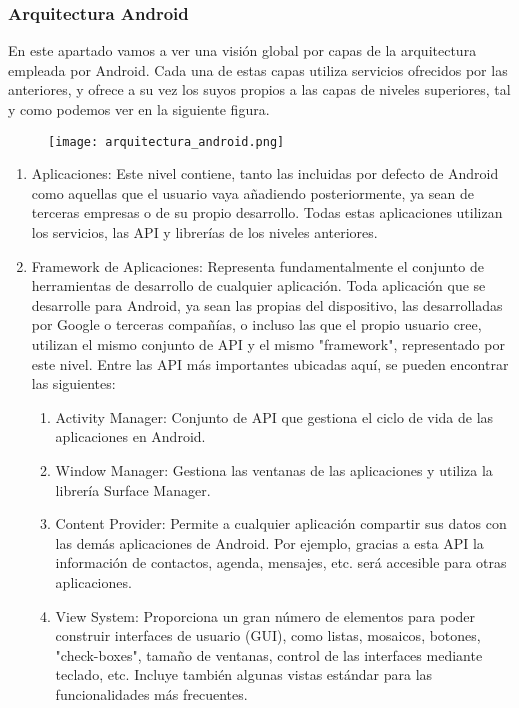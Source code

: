 	\subsubsection{Arquitectura Android}
En este apartado vamos a ver una visión global por capas de la
 arquitectura empleada por Android. Cada una de estas capas utiliza
 servicios ofrecidos por las anteriores, y ofrece a su vez los suyos 
propios a las capas de niveles superiores, tal y como podemos ver
 en la siguiente figura.
\begin{figure}[h]
\texttt{[image: arquitectura\_android.png]} 
\end{figure}


\begin{enumerate}
\item	Aplicaciones: Este nivel contiene, tanto las incluidas por defecto 
de Android como aquellas que el usuario vaya añadiendo posteriormente,
 ya sean de terceras empresas o de su propio desarrollo. 
Todas estas aplicaciones utilizan los servicios, las API y
 librerías de los niveles anteriores. 
\item	Framework de Aplicaciones: Representa fundamentalmente el
 conjunto de herramientas de desarrollo de cualquier aplicación. 
Toda aplicación que se desarrolle para Android, ya sean las propias 
del dispositivo, las desarrolladas por Google o terceras compañías,
 o incluso las que el propio usuario cree, utilizan el mismo conjunto
 de API y el mismo "framework", representado por este nivel. 
Entre las API más importantes ubicadas aquí, se pueden encontrar las siguientes:
\begin{enumerate}
\item	Activity Manager: Conjunto de API que gestiona el ciclo de vida de
 las aplicaciones en Android.
\item	Window Manager: Gestiona las ventanas de las aplicaciones y
 utiliza la librería Surface Manager.
\item	Content Provider: Permite a cualquier aplicación compartir sus
 datos con las demás aplicaciones de Android. Por ejemplo, gracias a 
esta API la información de contactos, agenda, mensajes, etc. 
será accesible para otras aplicaciones.
\item	View System: Proporciona un gran número de elementos para poder
 construir interfaces de usuario (GUI), como listas, mosaicos, 
botones, "check-boxes", tamaño de ventanas, control de las
 interfaces mediante teclado, etc. Incluye también algunas vistas
 estándar para las funcionalidades más frecuentes.

\end{enumerate}
\end{enumerate}
